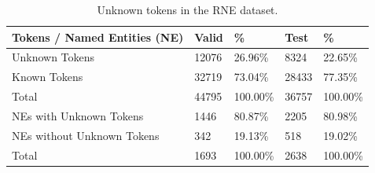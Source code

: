 \documentclass{nle}
\begin{document}
\begin{table}[h]
  \small
  \begin{center}
    \begin{tabular}{ lllll }
      \toprule
      Tokens / Named Entities (NE) & Valid & \% & Test & \%\\
      \midrule
      Unknown Tokens & 12076 & 26.96\% & 8324  & 22.65\% \\
      Known Tokens   & 32719 & 73.04\% & 28433 & 77.35\% \\
      Total          & 44795 & 100.00\%   & 36757 & 100.00\%   \\
      \midrule
      NEs with Unknown Tokens    & 1446 & 80.87\% & 2205 & 80.98\% \\
      NEs without Unknown Tokens & 342  & 19.13\% & 518  & 19.02\% \\
      Total                      & 1693 & 100.00\%   & 2638 & 100.00\%   \\
      \bottomrule
    \end{tabular}
  \end{center}
  \caption{Unknown tokens in the RNE dataset.}
  \label{tab:unknown_tokens}
\end{table}
\end{document}
